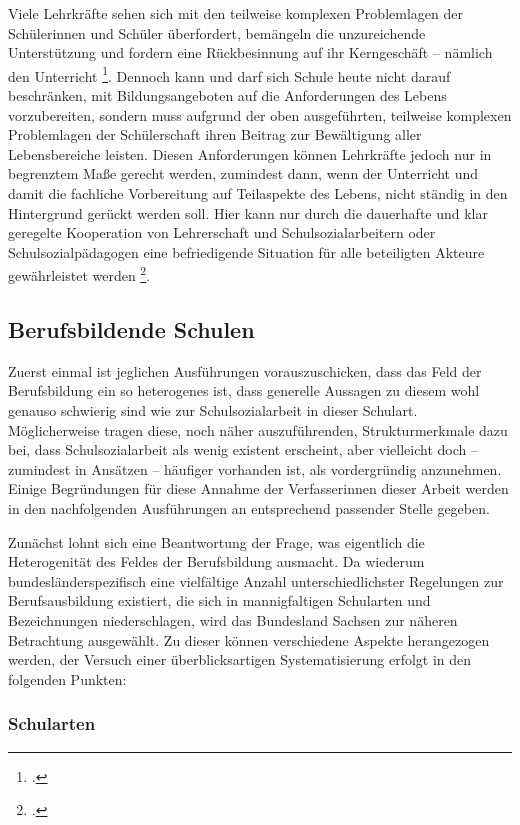 Viele Lehrkräfte sehen sich mit den teilweise komplexen Problemlagen der Schülerinnen und Schüler überfordert, bemängeln die unzureichende Unterstützung und fordern eine Rückbesinnung auf ihr Kerngeschäft -- nämlich den Unterricht \footcite[vgl.][10]{Drilling2009}. Dennoch kann und darf sich Schule heute nicht darauf beschränken, mit Bildungsangeboten auf die Anforderungen des Lebens vorzubereiten, sondern muss aufgrund der oben ausgeführten, teilweise komplexen Problemlagen der Schülerschaft ihren Beitrag zur Bewältigung aller Lebensbereiche leisten. Diesen Anforderungen können Lehrkräfte jedoch nur in begrenztem Maße gerecht werden, zumindest dann, wenn der Unterricht und damit die fachliche Vorbereitung auf Teilaspekte des Lebens, nicht ständig in den Hintergrund gerückt werden soll. Hier kann nur durch die dauerhafte und klar geregelte Kooperation von Lehrerschaft und Schulsozialarbeitern oder Schulsozialpädagogen eine befriedigende Situation für alle beteiligten Akteure gewährleistet werden \footcite[vgl.][9ff]{Drilling2009}. 

\subsection{Berufsbildende Schulen}
\label{sec:BerufsbildendeSchulen}

Zuerst einmal ist jeglichen Ausführungen vorauszuschicken, dass das Feld der Berufsbildung ein so heterogenes ist, dass generelle Aussagen zu diesem wohl genauso schwierig sind wie zur Schulsozialarbeit in dieser Schulart. Möglicherweise tragen diese, noch näher auszuführenden, Strukturmerkmale dazu bei, dass Schulsozialarbeit als wenig existent erscheint, aber vielleicht doch -- zumindest in Ansätzen -- häufiger vorhanden ist, als vordergründig anzunehmen. Einige Begründungen für diese Annahme der Verfasserinnen dieser Arbeit werden in den nachfolgenden Ausführungen an entsprechend passender Stelle gegeben. 

Zunächst lohnt sich eine Beantwortung der Frage, was eigentlich die Heterogenität des Feldes der Berufsbildung ausmacht. Da wiederum bundesländerspezifisch eine vielfältige Anzahl unterschiedlichster Regelungen zur Berufsausbildung existiert, die sich in mannigfaltigen Schularten und Bezeichnungen niederschlagen, wird das Bundesland Sachsen zur näheren Betrachtung ausgewählt. Zu dieser können verschiedene Aspekte herangezogen werden, der Versuch einer überblicksartigen Systematisierung erfolgt in den folgenden Punkten:

\subsubsection{Schularten}
\label{sec:Schularten}

